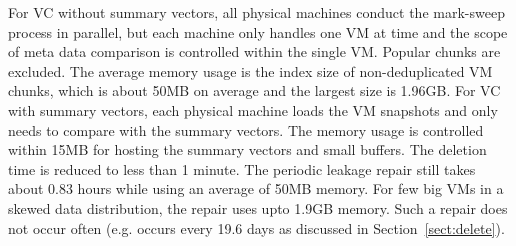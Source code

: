 For VC without summary vectors, all physical machines conduct the mark-sweep process in parallel, 
but each machine only handles one VM at time and 
the scope of meta data comparison is controlled within the single VM.
Popular chunks are excluded. The average memory usage is the index size of 
non-deduplicated VM chunks, which is about 50MB on average and the largest
size is 1.96GB. 
For VC with summary vectors, each physical machine loads
the VM snapshots and only needs to compare with the summary vectors.
The memory usage is controlled within 15MB for hosting the summary vectors
and small buffers. The deletion time is reduced to less than 1 minute.
The periodic leakage repair still takes about 0.83 hours while using
an average of 50MB memory. For  few big VMs in a skewed data distribution,
the repair uses upto 1.9GB memory.
Such a repair does not occur often (e.g. occurs every 19.6 days as discussed in Section~\ref{sect:delete}). 


